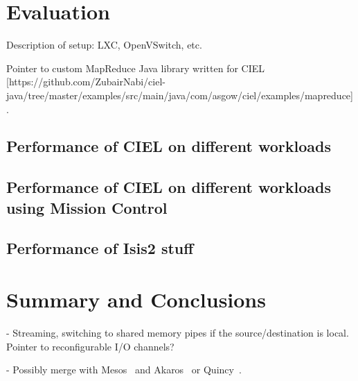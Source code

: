 \documentclass[a4paper,12pt,twoside,openright]{report}
\begin{document}
\chapter{Evaluation}\label{chapter:evaluation}

Description of setup: LXC, OpenVSwitch, etc.

Pointer to custom MapReduce Java library written for CIEL
[https://github.com/ZubairNabi/ciel-java/tree/master/examples/src/main/java/com/asgow/ciel/examples/mapreduce].

\section{Performance of CIEL on different workloads}
\section{Performance of CIEL on different workloads using Mission Control}
\section{Performance of Isis2 stuff}

\chapter{Summary and Conclusions}\label{chapter:conclusion}

 
- Streaming, switching to shared memory pipes if the source/destination is
local. Pointer to reconfigurable I/O channels?

- Possibly merge with Mesos~\cite{Hindman:2011:MPF} and
Akaros~\cite{Rhoden:2011:IPE} or Quincy~\cite{Isard:2009:QFS}.


\appendix
\singlespacing

 
 
\end{document}

